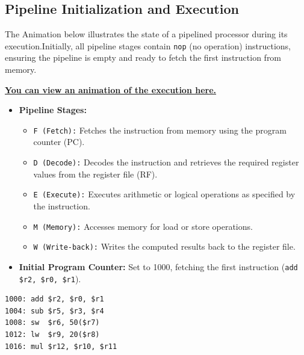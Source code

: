 \subsection{Pipeline Initialization and Execution}
The Animation below illustrates the state of a pipelined processor during its execution.Initially, all pipeline stages contain \texttt{nop} (no operation) instructions, ensuring the pipeline is empty and ready to fetch the first instruction from memory.
\begin{center}
    \href{https://github.com/elazdi-al/comparch/raw/refs/heads/main/chapters/chapter4c/images/video.mp4}{\textbf{You can view an animation of the execution here.}}
\end{center}
\begin{itemize}
    \item \textbf{Pipeline Stages:}
    \begin{itemize}
        \item \texttt{F (Fetch):} Fetches the instruction from memory using the program counter (PC).
        \item \texttt{D (Decode):} Decodes the instruction and retrieves the required register values from the register file (RF).
        \item \texttt{E (Execute):} Executes arithmetic or logical operations as specified by the instruction.
        \item \texttt{M (Memory):} Accesses memory for load or store operations.
        \item \texttt{W (Write-back):} Writes the computed results back to the register file.
    \end{itemize}
    \item \textbf{Initial Program Counter:} Set to 1000, fetching the first instruction (\texttt{add \$r2, \$r0, \$r1}).
\end{itemize}

\begin{verbatim}
1000: add $r2, $r0, $r1
1004: sub $r5, $r3, $r4
1008: sw  $r6, 50($r7)
1012: lw  $r9, 20($r8)
1016: mul $r12, $r10, $r11
\end{verbatim}

